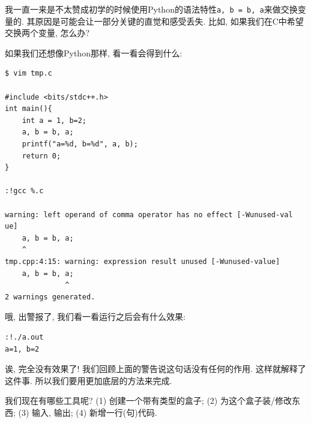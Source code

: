 
我一直一来是不太赞成初学的时候使用Python的语法特性\texttt{a, b = b, a}来做交换变量的. 其原因是可能会让一部分关键的直觉和感受丢失. 比如, 如果我们在C中希望交换两个变量, 怎么办? 

如果我们还想像Python那样, 看一看会得到什么: 

\begin{lstlisting}	
$ vim tmp.c

#include <bits/stdc++.h>
int main(){
    int a = 1, b=2; 
    a, b = b, a;
    printf("a=%d, b=%d", a, b);
    return 0;
}

:!gcc %.c

warning: left operand of comma operator has no effect [-Wunused-val
ue]
    a, b = b, a;
    ^
tmp.cpp:4:15: warning: expression result unused [-Wunused-value]
    a, b = b, a;
              ^
2 warnings generated.
\end{lstlisting}

哦, 出警报了, 我们看一看运行之后会有什么效果: 

\begin{lstlisting}
:!./a.out
a=1, b=2
\end{lstlisting}

诶, 完全没有效果了! 我们回顾上面的警告说这句话没有任何的作用. 这样就解释了这件事. 所以我们要用更加底层的方法来完成. 

我们现在有哪些工具呢? (1) 创建一个带有类型的盒子; (2) 为这个盒子装/修改东西; (3) 输入, 输出; (4) 新增一行(句)代码. 










